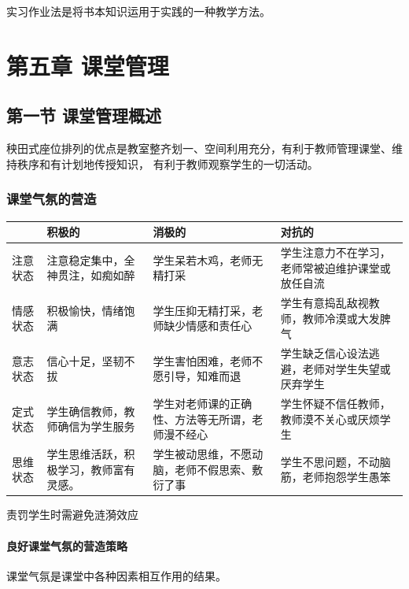 \documentclass[b5paper,11pt]{article}
\begin{document}
实习作业法是将书本知识运用于实践的一种教学方法。

\section{第五章 \space 课堂管理}
\subsection{第一节 \space 课堂管理概述}
\begin{cquote}
  秧田式座位排列的优点是教室整齐划一、空间利用充分，有利于教师管理课堂、维持秩序和有计划地传授知识，
  有利于教师观察学生的一切活动。
\end{cquote}

\subsubsection{课堂气氛的营造}
\begin{table}[!ht]
    \centering
  \small
  \setlength{\tabcolsep}{3pt}
  \renewcommand{\arraystretch}{1.15}
  \begin{tabular}{@{}p{}p{}p{}p{}@{}}
    \hline
        ~ & 积极的 & 消极的 & 对抗的 \\ \hline
        注意状态 & 注意稳定集中，全神贯注，如痴如醉 & 学生呆若木鸡，老师无精打采 & 学生注意力不在学习，老师常被迫维护课堂或放任自流 \\ \hline
        情感状态 & 积极愉快，情绪饱满 & 学生压抑无精打采，老师缺少情感和责任心 & 学生有意捣乱敌视教师，教师冷漠或大发脾气 \\ \hline
        意志状态 & 信心十足，坚韧不拔 & 学生害怕困难，老师不愿引导，知难而退 & 学生缺乏信心设法逃避，老师对学生失望或厌弃学生 \\ \hline
        定式状态 & 学生确信教师，教师确信为学生服务 & 学生对老师课的正确性、方法等无所谓，老师漫不经心 & 学生怀疑不信任教师，教师漠不关心或厌烦学生 \\ \hline
        思维状态 & 学生思维活跃，积极学习，教师富有灵感。 & 学生被动思维，不愿动脑，老师不假思索、敷衍了事 & 学生不思问题，不动脑筋，老师抱怨学生愚笨 \\ \hline
    \end{tabular}
\end{table}

\textcolor{ctp-red}{责罚学生时需避免涟漪效应}

\paragraph{良好课堂气氛的营造策略} 课堂气氛是课堂中各种因素相互作用的结果。
\end{document}
